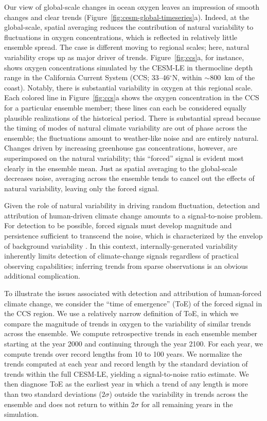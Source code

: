 \documentclass[draft,linenumbers]{report_chapter}
\begin{document}
Our view of global-scale changes in ocean oxygen leaves an impression of smooth changes and clear trends (Figure~\ref{fig:cesm-global-timeseries}a).
Indeed, at the global-scale, spatial averaging reduces the contribution of natural variability to fluctuations in oxygen concentrations, which is reflected in relatively little ensemble spread.
The case is different moving to regional scales; here, natural variability crops up as major driver of trends.
Figure~\ref{fig:ccs}a, for instance, shows oxygen concentrations simulated by the CESM-LE in thermocline depth range in the California Current System (CCS; 33--46$^\circ$N, within $\sim$800~km of the coast).
Notably, there is substantial variability in oxygen at this regional scale.
Each colored line in Figure~\ref{fig:ccs}a shows the oxygen concentration in the CCS for a particular ensemble member; these lines can each be considered equally plausible realizations of the historical period.
There is substantial spread because the timing of modes of natural climate variability are out of phase across the ensemble; the fluctuations amount to weather-like noise and are entirely natural.
Changes driven by increasing greenhouse gas concentrations, however, are superimposed on the natural variability; this ``forced'' signal is evident most clearly in the ensemble mean.
Just as spatial averaging to the global-scale decreases noise, averaging across the ensemble tends to cancel out the effects of natural variability, leaving only the forced signal.

Given the role of natural variability in driving random fluctuation, detection and attribution of human-driven climate change amounts to a signal-to-noise problem.
For detection to be possible, forced signals must develop magnitude and persistence sufficient to transcend the noise, which is characterized by the envelop of background variability \citep{Hasselmann-1993,Santer-Bruggemann-etal-1994,Santer-Mears-etal-2011}.
In this context, internally-generated variability inherently limits detection of climate-change signals regardless of practical observing capabilities; inferring trends from sparse observations is an obvious additional complication.

To illustrate the issues associated with detection and attribution of human-forced climate change, we consider the ``time of emergence'' (ToE) of the forced signal in the CCS region.
We use a relatively narrow definition of ToE, in which we compare the magnitude of trends in oxygen to the variability of similar trends across the ensemble.
We compute retrospective trends in each ensemble member starting at the year 2000 and continuing through the year 2100.
For each year, we compute trends over record lengths from 10 to 100 years.
We normalize the trends computed at each year and record length by the standard deviation of trends within the full CESM-LE, yielding a signal-to-noise ratio estimate.
We then diagnose ToE as the earliest year in which a trend of any length is more than two standard deviations ($2\sigma$) outside the variability in trends across the ensemble and does not return to within $2\sigma$ for all remaining years in the simulation.
\end{document}
